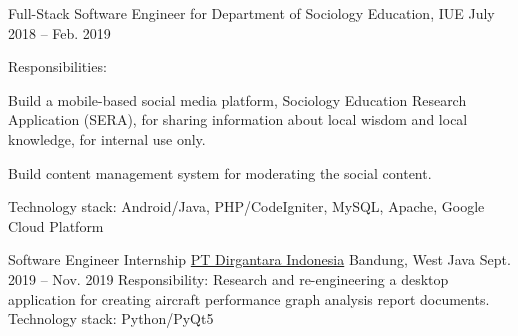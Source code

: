 \begin{cventries}
\cventry
{Full-Stack Software Engineer for Department of Sociology Education, IUE} %
{} %
{} %
{July 2018 -- Feb. 2019} %
{ %
Responsibilities:
\vspace{5mm}
\begin{cvitems}
\item {Build a mobile-based social media platform, Sociology Education Research Application (SERA), for sharing information about local wisdom and local knowledge, for internal use only.}
\item {Build content management system for moderating the social content.}
\end{cvitems}
\vspace{4mm}
Technology stack: Android/Java, PHP/CodeIgniter, MySQL, Apache, Google Cloud Platform
}




\cventry
{Software Engineer Internship} %
{\href{https://www.indonesian-aerospace.com/}{PT Dirgantara Indonesia}} %
{Bandung, West Java} %
{Sept. 2019 -- Nov. 2019} %
{ %
Responsibility: Research and re-engineering a desktop application for creating aircraft performance graph analysis report documents.
\linebreak
Technology stack: Python/PyQt5
}



\end{cventries}
